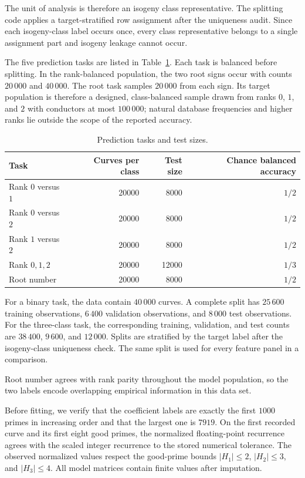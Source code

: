 \documentclass[12pt,reqno]{amsart}
\numberwithin{equation}{section}
\theoremstyle{plain}
\theoremstyle{definition}
\theoremstyle{remark}
\begin{document}
The unit of analysis is therefore an isogeny class representative.
The splitting code applies a target-stratified row assignment after the uniqueness audit.
Since each isogeny-class label occurs once, every class representative belongs to a single assignment part and isogeny leakage cannot occur.

The five prediction tasks are listed in Table~\ref{tabTasks}.
Each task is balanced before splitting.  In the rank-balanced population, the two root signs occur with counts $20\,000$ and $40\,000$.
The root task samples $20\,000$ from each sign.
Its target population is therefore a designed, class-balanced sample drawn from ranks $0$, $1$, and $2$ with conductors at most $100\,000$; natural database frequencies and higher ranks lie outside the scope of the reported accuracy.

\begin{table}[t]
\centering
\caption{Prediction tasks and test sizes.}
\label{tabTasks}
\begin{tabular}{lrrr}
\toprule
Task & Curves per class & Test size & Chance balanced accuracy\\
\midrule
Rank $0$ versus $1$ & 20000 & 8000 & $1/2$\\
Rank $0$ versus $2$ & 20000 & 8000 & $1/2$\\
Rank $1$ versus $2$ & 20000 & 8000 & $1/2$\\
Rank $0,1,2$ & 20000 & 12000 & $1/3$\\
Root number & 20000 & 8000 & $1/2$\\
\bottomrule
\end{tabular}
\end{table}

For a binary task, the data contain $40\,000$ curves.  A complete split has $25\,600$ training observations, $6\,400$ validation observations, and $8\,000$ test observations.
For the three-class task, the corresponding training, validation, and test counts are $38\,400$, $9\,600$, and $12\,000$.
Splits are stratified by the target label after the isogeny-class uniqueness check.
The same split is used for every feature panel in a comparison.

Root number agrees with rank parity throughout the model population, so the two labels encode overlapping empirical information in this data set.

Before fitting, we verify that the coefficient labels are exactly the first $1000$ primes in increasing order and that the largest one is $7919$.
On the first recorded curve and its first eight good primes, the normalized floating-point recurrence agrees with the scaled integer recurrence to the stored numerical tolerance.
The observed normalized values respect the good-prime bounds $|H_1|\leq2$, $|H_2|\leq3$, and $|H_3|\leq4$.
All model matrices contain finite values after imputation.
\end{document}
